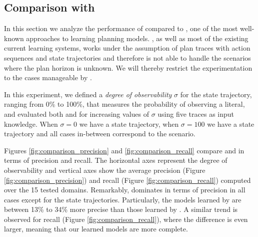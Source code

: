 

\subsection{Comparison with \ARMS}

In this section we analyze the performance of \FAMA compared to \ARMS, one of the most well-known approaches to learning planning models. \ARMS, as well as most of the existing current learning systems, works under the assumption of plan traces with \FO action sequences and \NO state trajectories and therefore is not able to handle the scenarios where the plan horizon is unknown. We will thereby restrict the experimentation to the cases manageable by \ARMS.

In this experiment, we defined a \emph{degree of observability} $\sigma$ for the state trajectory, ranging from 0\% to 100\%, that measures the probability of observing a literal, and evaluated both \FAMA and \ARMS for increasing values of $\sigma$ using five traces as input knowledge. When $\sigma = 0$ we have a \NO state trajectory, when $\sigma=100$ we have a \FO state trajectory and all cases in-between correspond to the \PO scenario.

Figures \ref{fig:comparison_precision} and \ref{fig:comparison_recall} compare \FAMA and \ARMS in terms of precision and recall. The horizontal axes represent the degree of observability and vertical axes show the average precision (Figure \ref{fig:comparison_precision}) and recall (Figure \ref{fig:comparison_recall}) computed over the 15 tested domains. Remarkably, \FAMA dominates in terms of precision in all cases except for the \FO state trajectories. Particularly, the models learned by \FAMA are between 13\% to 34\% more precise than those learned by \ARMS. A similar trend is observed for recall (Figure \ref{fig:comparison_recall}), where the difference is even larger, meaning that our learned models are more complete.

